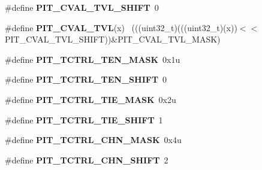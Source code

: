 \begin{DoxyCompactItemize}
\item 
\hypertarget{group___p_i_t___register___masks_ga28753a1a45034ccd34e052faa3e02ff0}{}\#define {\bfseries P\+I\+T\+\_\+\+C\+V\+A\+L\+\_\+\+T\+V\+L\+\_\+\+S\+H\+I\+F\+T}~0\label{group___p_i_t___register___masks_ga28753a1a45034ccd34e052faa3e02ff0}

\item 
\hypertarget{group___p_i_t___register___masks_ga2fb557548a66d3bcc505e50f298bf1df}{}\#define {\bfseries P\+I\+T\+\_\+\+C\+V\+A\+L\+\_\+\+T\+V\+L}(x)                                                ~(((uint32\+\_\+t)(((uint32\+\_\+t)(x))$<$$<$P\+I\+T\+\_\+\+C\+V\+A\+L\+\_\+\+T\+V\+L\+\_\+\+S\+H\+I\+F\+T))\&P\+I\+T\+\_\+\+C\+V\+A\+L\+\_\+\+T\+V\+L\+\_\+\+M\+A\+S\+K)\label{group___p_i_t___register___masks_ga2fb557548a66d3bcc505e50f298bf1df}

\item 
\hypertarget{group___p_i_t___register___masks_ga1099670711f996f5fa84e33bbfe794b2}{}\#define {\bfseries P\+I\+T\+\_\+\+T\+C\+T\+R\+L\+\_\+\+T\+E\+N\+\_\+\+M\+A\+S\+K}~0x1u\label{group___p_i_t___register___masks_ga1099670711f996f5fa84e33bbfe794b2}

\item 
\hypertarget{group___p_i_t___register___masks_ga0080137ff0378087f08cc12fd10b3e1f}{}\#define {\bfseries P\+I\+T\+\_\+\+T\+C\+T\+R\+L\+\_\+\+T\+E\+N\+\_\+\+S\+H\+I\+F\+T}~0\label{group___p_i_t___register___masks_ga0080137ff0378087f08cc12fd10b3e1f}

\item 
\hypertarget{group___p_i_t___register___masks_ga99639aabcac1d6042d14e7893d00bf67}{}\#define {\bfseries P\+I\+T\+\_\+\+T\+C\+T\+R\+L\+\_\+\+T\+I\+E\+\_\+\+M\+A\+S\+K}~0x2u\label{group___p_i_t___register___masks_ga99639aabcac1d6042d14e7893d00bf67}

\item 
\hypertarget{group___p_i_t___register___masks_gae21aee9e81741a924c9f2824fbc5775b}{}\#define {\bfseries P\+I\+T\+\_\+\+T\+C\+T\+R\+L\+\_\+\+T\+I\+E\+\_\+\+S\+H\+I\+F\+T}~1\label{group___p_i_t___register___masks_gae21aee9e81741a924c9f2824fbc5775b}

\item 
\hypertarget{group___p_i_t___register___masks_ga734e2e947c649d50b9ca46405e451c2b}{}\#define {\bfseries P\+I\+T\+\_\+\+T\+C\+T\+R\+L\+\_\+\+C\+H\+N\+\_\+\+M\+A\+S\+K}~0x4u\label{group___p_i_t___register___masks_ga734e2e947c649d50b9ca46405e451c2b}

\item 
\hypertarget{group___p_i_t___register___masks_ga9a1c8aa25a05c9b2c9503a003fa8d24d}{}\#define {\bfseries P\+I\+T\+\_\+\+T\+C\+T\+R\+L\+\_\+\+C\+H\+N\+\_\+\+S\+H\+I\+F\+T}~2\label{group___p_i_t___register___masks_ga9a1c8aa25a05c9b2c9503a003fa8d24d}


\end{DoxyCompactItemize}
